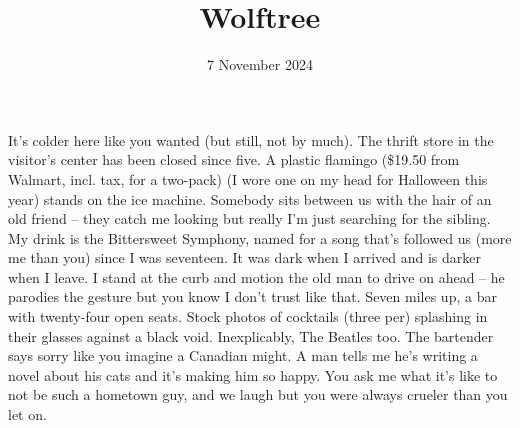 \documentclass[11pt]{article}
\title{Wolftree}
\date{7 November 2024}
\begin{document}
    \maketitle
    It's colder here like you wanted (but still, not by much). The thrift store in the visitor's center has been closed since five. A plastic flamingo (\$19.50 from Walmart, incl. tax, for a two-pack) (I wore one on my head for Halloween this year) stands on the ice machine. Somebody sits between us with the hair of an old friend -- they catch me looking but really I'm just searching for the sibling. My drink is the Bittersweet Symphony, named for a song that's followed us (more me than you) since I was seventeen. It was dark when I arrived and is darker when I leave. I stand at the curb and motion the old man to drive on ahead -- he parodies the gesture but you know I don't trust like that. Seven miles up, a bar with twenty-four open seats. Stock photos of cocktails (three per) splashing in their glasses against a black void. Inexplicably, The Beatles too. The bartender says sorry like you imagine a Canadian might. A man tells me he's writing a novel about his cats and it's making him so happy. You ask me what it's like to not be such a hometown guy, and we laugh but you were always crueler than you let on.
\end{document}
